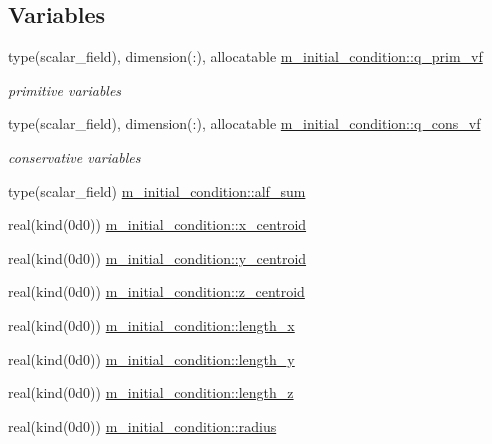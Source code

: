 \subsection*{Variables}
\begin{DoxyCompactItemize}
\item 
type(scalar\+\_\+field), dimension(\+:), allocatable \hyperlink{namespacem__initial__condition_ad9935d4b9c2f6a7af08f3630681d0c1a}{m\+\_\+initial\+\_\+condition\+::q\+\_\+prim\+\_\+vf}
\begin{DoxyCompactList}\small\item\em primitive variables \end{DoxyCompactList}\item 
type(scalar\+\_\+field), dimension(\+:), allocatable \hyperlink{namespacem__initial__condition_a1f42c68f3b3d167616d52b7cf7a7d56a}{m\+\_\+initial\+\_\+condition\+::q\+\_\+cons\+\_\+vf}
\begin{DoxyCompactList}\small\item\em conservative variables \end{DoxyCompactList}\item 
type(scalar\+\_\+field) \hyperlink{namespacem__initial__condition_a2fa2c238e1c0c522aeecada3f6cc314d}{m\+\_\+initial\+\_\+condition\+::alf\+\_\+sum}
\item 
real(kind(0d0)) \hyperlink{namespacem__initial__condition_aaf66843a6e051174a3cde0729daa1300}{m\+\_\+initial\+\_\+condition\+::x\+\_\+centroid}
\item 
real(kind(0d0)) \hyperlink{namespacem__initial__condition_a6cef3dccb0374a24cb372bd7d4c0b43f}{m\+\_\+initial\+\_\+condition\+::y\+\_\+centroid}
\item 
real(kind(0d0)) \hyperlink{namespacem__initial__condition_aca427fa4af7501277f10bf96977a9766}{m\+\_\+initial\+\_\+condition\+::z\+\_\+centroid}
\item 
real(kind(0d0)) \hyperlink{namespacem__initial__condition_ab59e590873d32a54651ac60af6b1a6e4}{m\+\_\+initial\+\_\+condition\+::length\+\_\+x}
\item 
real(kind(0d0)) \hyperlink{namespacem__initial__condition_a49ed82b4f9548cd8166844888028c8cd}{m\+\_\+initial\+\_\+condition\+::length\+\_\+y}
\item 
real(kind(0d0)) \hyperlink{namespacem__initial__condition_a0d9d1bcde238177f0beb7684e252aa69}{m\+\_\+initial\+\_\+condition\+::length\+\_\+z}
\item 
real(kind(0d0)) \hyperlink{namespacem__initial__condition_a51a6afec0ff2f62c62b6cf86bd2c16e4}{m\+\_\+initial\+\_\+condition\+::radius}

\end{DoxyCompactItemize}
